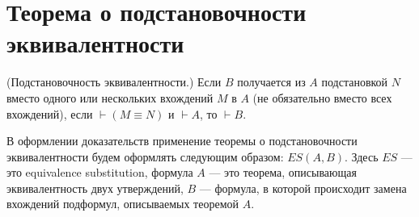 \section{Теорема о подстановочности эквивалентности}

\begin{theorem}
    (Подстановочность эквивалентности.) Если $B$ получается из $A$ подстановкой $N$ вместо одного или нескольких вхождений $M$ в $A$ (не обязательно вместо всех вхождений), если $\vdash (M \equiv N)$ и $\vdash A$, то $\vdash B$.
\end{theorem}

\begin{remark}
    В оформлении доказательств применение теоремы о подстановочности эквивалентности будем оформлять следующим образом: $ES(A, B)$. Здесь $ES$ --- это equivalence substitution, формула $A$ --- это теорема, описывающая эквивалентность двух утверждений, $B$ --- формула, в которой происходит замена вхождений подформул, описываемых теоремой $A$.
\end{remark}